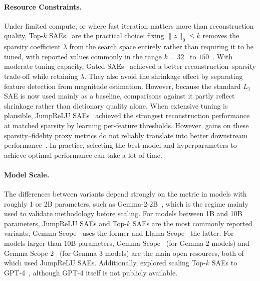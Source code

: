 \paragraph{Resource Constraints.}
Under limited compute, or where fast iteration matters more than reconstruction quality,
Top-$k$ SAEs~ are the practical choice:
fixing $\|z\|_0 \le k$ removes the sparsity coefficient $\lambda$ from the search space
entirely rather than requiring it to be tuned, with reported values commonly in the range
$k = 32$~ to $150$~. With moderate tuning capacity, Gated
SAEs~ achieved a better
reconstruction--sparsity trade-off while retaining $\lambda$. They also avoid the shrinkage effect by separating feature detection from magnitude estimation. However, because the standard $L_1$ SAE is now used mainly as a baseline, comparisons against it partly reflect shrinkage rather than dictionary quality alone. When extensive tuning is plausible, JumpReLU
SAEs~ achieved the strongest reconstruction performance at matched sparsity by learning per-feature thresholds. However,
gains on these sparsity--fidelity proxy metrics do not reliably translate
into better downstream performance~. In practice, selecting the best model and hyperparameters to achieve optimal performance can take a lot of time.

\paragraph{Model Scale.}
The differences between variants depend strongly on the metric in models with roughly 1 or 2B parameters, such as Gemma-2-2B~, which is the regime mainly used to validate methodology before scaling. For models between 1B and 10B parameters, JumpReLU SAEs and Top-$k$ SAEs are the most commonly reported variants; Gemma Scope~ uses the former and Llama Scope~ the latter. For models larger than 10B parameters, Gemma Scope~ (for Gemma 2 models) and Gemma Scope 2~ (for Gemma 3 models) are the main open resources, both of which used JumpReLU SAEs. Additionally,  explored scaling Top-$k$ SAEs to GPT-4~, although GPT-4 itself is not publicly available.

